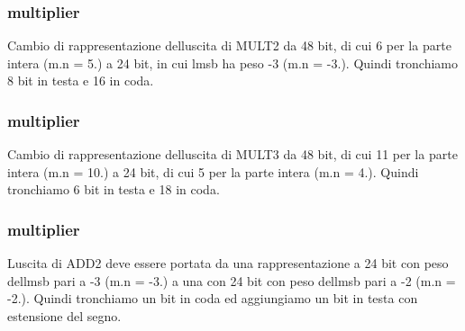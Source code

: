 \subsubsection[{\texorpdfstring{mult3}{mult3}}]{ {\bfseries \textcolor{vhdlchar}{multiplier}\textcolor{vhdlchar}{ }} \hspace{0.3cm}{\ttfamily [Instantiation]}}\hypertarget{class_linear_regression_1_1_structural_adf80c8ef67f9eb716830cfb9a6d3a980}{}\label{class_linear_regression_1_1_structural_adf80c8ef67f9eb716830cfb9a6d3a980}
Cambio di rappresentazione dell\textquotesingle{}uscita di M\+U\+L\+T2 da 48 bit, di cui 6 per la parte intera (m.\+n = 5.) a 24 bit, in cui l\textquotesingle{}msb ha peso -\/3 (m.\+n = -\/3.). Quindi tronchiamo 8 bit in testa e 16 in coda. 
\subsubsection[{\texorpdfstring{mult4}{mult4}}]{ {\bfseries \textcolor{vhdlchar}{multiplier}\textcolor{vhdlchar}{ }} \hspace{0.3cm}{\ttfamily [Instantiation]}}\hypertarget{class_linear_regression_1_1_structural_a65ae62ab3b1e6675bf4e4bcf572d2025}{}\label{class_linear_regression_1_1_structural_a65ae62ab3b1e6675bf4e4bcf572d2025}
Cambio di rappresentazione dell\textquotesingle{}uscita di M\+U\+L\+T3 da 48 bit, di cui 11 per la parte intera (m.\+n = 10.) a 24 bit, di cui 5 per la parte intera (m.\+n = 4.). Quindi tronchiamo 6 bit in testa e 18 in coda. 
\subsubsection[{\texorpdfstring{mult5}{mult5}}]{ {\bfseries \textcolor{vhdlchar}{multiplier}\textcolor{vhdlchar}{ }} \hspace{0.3cm}{\ttfamily [Instantiation]}}\hypertarget{class_linear_regression_1_1_structural_aed551c15ed15fe4ab7d0c073a7e33b9c}{}\label{class_linear_regression_1_1_structural_aed551c15ed15fe4ab7d0c073a7e33b9c}
L\textquotesingle{}uscita di A\+D\+D2 deve essere portata da una rappresentazione a 24 bit con peso dell\textquotesingle{}msb pari a -\/3 (m.\+n = -\/3.) a una con 24 bit con peso dell\textquotesingle{}msb pari a -\/2 (m.\+n = -\/2.). Quindi tronchiamo un bit in coda ed aggiungiamo un bit in testa con estensione del segno. 
